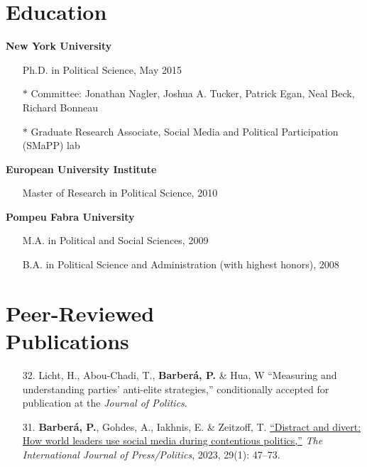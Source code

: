\documentclass[margin,line,11pt]{resume}
\begin{document}
\begin{resume}
    \section{\mysidestyle Education}
\textbf{New York University}
\begin{itemize}
\item[] Ph.D. in Political Science, May 2015
\vspace{-.15cm}
\item[] $\ast$ Committee: Jonathan Nagler, Joshua A. Tucker, Patrick Egan, Neal Beck, Richard Bonneau
\vspace{-.15cm}
\item[] $\ast$  Graduate Research Associate, Social Media and Political Participation (SMaPP) lab
\end{itemize}
\vspace{-.30cm}
\textbf{European University Institute} 
\begin{itemize}
\item[] Master of Research in Political Science, 2010
\end{itemize}
\vspace{-.30cm}
\textbf{Pompeu Fabra University} 
\begin{itemize}
\item[] M.A. in Political and Social Sciences, 2009
\vspace{-.15cm}
\item[] B.A. in Political Science and Administration (with highest honors), 2008 
\end{itemize}

    \section{\mysidestyle Peer-Reviewed\\Publications}
\vspace{.15cm}    
\begin{itemize}[leftmargin=5.5mm]

\item[32.] Licht, H., Abou-Chadi, T., \textbf{Barber\'{a}, P.} \& Hua, W ``Measuring and understanding parties’ anti-elite strategies,'' conditionally accepted for publication at the \textit{Journal of Politics}.

\item[31.] \textbf{Barber\'{a}, P.}, Gohdes, A., Iakhnis, E. \& Zeitzoff, T. \href{https://journals.sagepub.com/doi/abs/10.1177/19401612221102030}{``Distract and divert: How world leaders use social media during contentious politics,''} \textit{The International Journal of Press/Politics}, 2023, 29(1): 47–73.


\end{itemize}
\end{resume}
\end{document}
